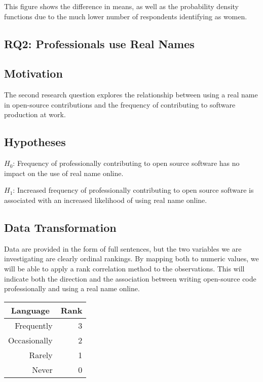 \documentclass[journal,12pt,onecolumn,]{IEEEtran}
\begin{document}
This figure shows the difference in means, as well as the probability density functions due to the much lower number of respondents identifying as women.

\subsection{RQ2: Professionals use Real Names}

\subsection{Motivation}

The second research question explores the relationship between using a real name in open-source contributions and the frequency of contributing to software production at work.

\subsection{Hypotheses}

$H_0$: Frequency of professionally contributing to open source software has no impact on the use of real name online.

$H_1$: Increased frequency of professionally contributing to open source software is associated with an increased likelihood of using real name online.

\subsection{Data Transformation}

Data are provided in the form of full sentences, but the two variables we are investigating are clearly ordinal rankings.
By mapping both to numeric values, we will be able to apply a rank correlation method to the observations.
This will indicate both the direction and the association between writing open-source code professionally and using a real name online.

\begin{table}[h]
    \begin{tabular}{|r|r|}
        \hline
        \multicolumn{1}{|c|}{\textbf{Language}} & \multicolumn{1}{c|}{\textbf{Rank}} \\ \hline
        Frequently                              & 3                                  \\ \hline
        Occasionally                            & 2                                  \\ \hline
        Rarely                                  & 1                                  \\ \hline
        Never                                   & 0                                  \\ \hline
    \end{tabular}
\end{table}
\end{document}
